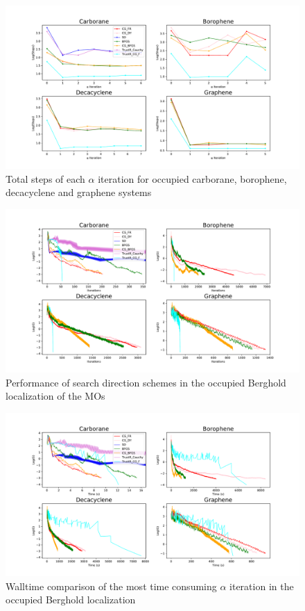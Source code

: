 \documentclass[aps,prl,reprint,amsmath,amssymb]{revtex4-1}
\begin{document}
\begin{figure}[htb]
\centering
\includegraphics[width=\textwidth]{occupied_iter.pdf}
\caption{Total steps of each $\alpha$ iteration for occupied carborane, borophene, decacyclene and graphene systems}
\label{fig:occ_iter}
\end{figure}


\begin{figure}[htb]
\centering
\includegraphics[width=\textwidth]{occupied_grad.pdf}
\caption{Performance of search direction schemes in the occupied Berghold localization of the MOs}
\label{fig:occ_grad}
\end{figure}


\begin{figure}[htb]
\centering
\includegraphics[width=\textwidth]{occupied_walltime.pdf}
\caption{Walltime comparison of the most time consuming $\alpha$ iteration in the occupied Berghold localization}
\label{fig:occ_walltime}
\end{figure}
\end{document}

